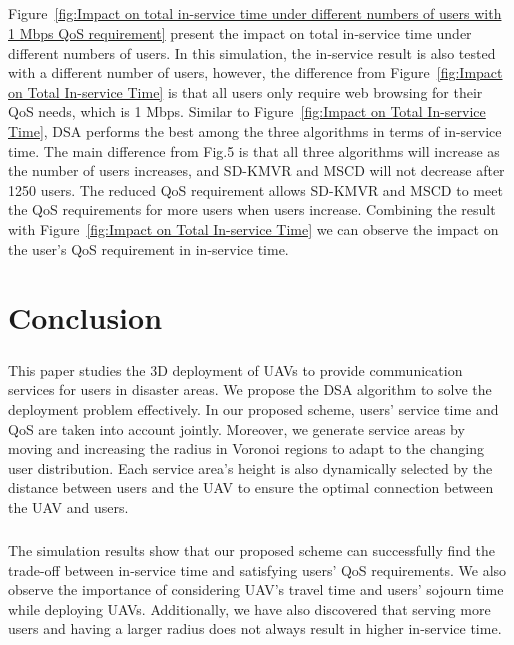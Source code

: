 \documentclass[a4paper,12pt]{report}
\begin{document}
\paragraph{}
Figure~\ref{fig:Impact on total in-service time under different numbers of users with 1 Mbps QoS requirement} present the impact on total in-service time under different numbers of users. In this simulation, the in-service result is also tested with a different number of users, however, the difference from Figure~\ref{fig:Impact on Total In-service Time} is that all users only require web browsing for their QoS needs, which is 1 Mbps. Similar to Figure~\ref{fig:Impact on Total In-service Time}, DSA performs the best among the three algorithms in terms of in-service time. The main difference from Fig.5 is that all three algorithms will increase as the number of users increases, and SD-KMVR and MSCD will not decrease after 1250 users. The reduced QoS requirement allows SD-KMVR and MSCD to meet the QoS requirements for more users when users increase. Combining the result with Figure~\ref{fig:Impact on Total In-service Time} we can observe the impact on the user's QoS requirement in in-service time.

\chapter{Conclusion}
\paragraph{}
This paper studies the 3D deployment of UAVs to provide communication services for users in disaster areas. We propose the DSA algorithm to solve the deployment problem effectively. In our proposed scheme, users' service time and QoS are taken into account jointly. Moreover, we generate service areas by moving and increasing the radius in Voronoi regions to adapt to the changing user distribution. Each service area's height is also dynamically selected by the distance between users and the UAV to ensure the optimal connection between the UAV and users.
\paragraph{}
The simulation results show that our proposed scheme can successfully find the trade-off between in-service time and satisfying users' QoS requirements. We also observe the importance of considering UAV's travel time and users' sojourn time while deploying UAVs. Additionally, we have also discovered that serving more users and having a larger radius does not always result in higher in-service time.



\end{document}
